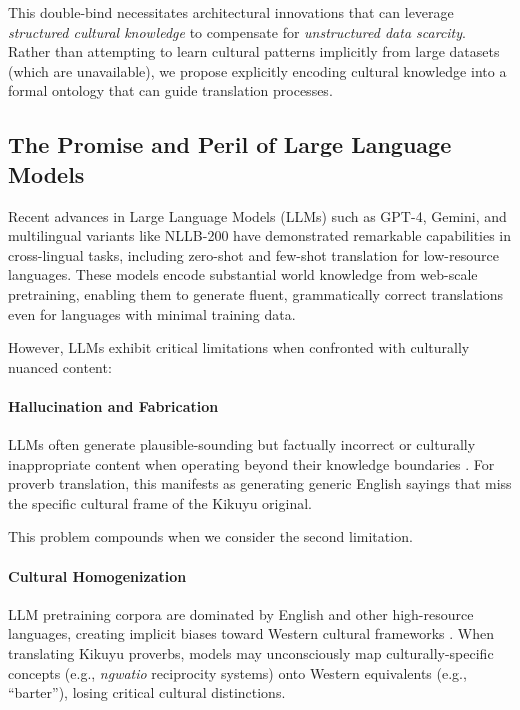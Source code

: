 This double-bind necessitates architectural innovations that can leverage \emph{structured cultural knowledge} to compensate for \emph{unstructured data scarcity}. Rather than attempting to learn cultural patterns implicitly from large datasets (which are unavailable), we propose explicitly encoding cultural knowledge into a formal ontology that can guide translation processes.

\subsection{The Promise and Peril of Large Language Models}
\label{subsec:llm_context}

Recent advances in Large Language Models (LLMs) such as GPT-4, Gemini, and multilingual variants like NLLB-200 \cite{costa2022no} have demonstrated remarkable capabilities in cross-lingual tasks, including zero-shot and few-shot translation for low-resource languages. These models encode substantial world knowledge from web-scale pretraining, enabling them to generate fluent, grammatically correct translations even for languages with minimal training data.

However, LLMs exhibit critical limitations when confronted with culturally nuanced content:

\paragraph{Hallucination and Fabrication} LLMs often generate plausible-sounding but factually incorrect or culturally inappropriate content when operating beyond their knowledge boundaries \cite{zhang2023siren}. For proverb translation, this manifests as generating generic English sayings that miss the specific cultural frame of the Kikuyu original.

This problem compounds when we consider the second limitation.

\paragraph{Cultural Homogenization} LLM pretraining corpora are dominated by English and other high-resource languages, creating implicit biases toward Western cultural frameworks \cite{blodgett2020language}. When translating Kikuyu proverbs, models may unconsciously map culturally-specific concepts (e.g., \emph{ngwatio} reciprocity systems) onto Western equivalents (e.g., ``barter''), losing critical cultural distinctions.

